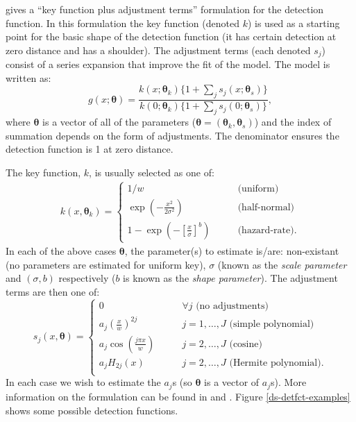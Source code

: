 \label{cor-7s5} gives a ``key function plus adjustment terms'' formulation for the detection function. In this formulation the key function (denoted $k$) is used as a starting point for the basic shape of the detection function (it has certain detection at zero distance and has a shoulder). The adjustment terms (each denoted $s_j$) consist of a series expansion that improve the fit of the model. The model is written as:
\begin{equation*}
g(x; \bm{\theta}) = \frac{k(x; \bm{\theta}_k) \{1+\sum_j s_j(x; \bm{\theta}_s)\}}{k(0; \bm{\theta}_k) \{1+ \sum_j s_j(0; \bm{\theta}_s)\}},
\end{equation*}
where $\bm{\theta}$ is a vector of all of the parameters ($\bm{\theta}=(\bm{\theta}_k,\bm{\theta}_s)$) and the index of summation depends on the form of adjustments. The denominator ensures the detection function is 1 at zero distance. 

The key function, $k$, is usually selected as one of:
\begin{align*}
k(x,\bm{\theta}_k) = \begin{cases} 1/w &\qquad \text{(uniform)}\\
\exp \left( -\frac{x^2}{2\sigma^2}\right) &\qquad \text{(half-normal)}\\
1- \exp \left( -\left[ \frac{x}{\sigma}\right]^b\right) &\qquad \text{(hazard-rate)}.
\label{ds-detfct}
\end{cases}
\end{align*}
In each of the above cases $\bm{\theta}$, the parameter(s) to estimate is/are: non-existant (no parameters are estimated for uniform key), $\sigma$ (known as the \textit{scale parameter} and $(\sigma,b)$ respectively ($b$ is known as the \textit{shape parameter}). The adjustment terms are then one of:
\begin{equation*}
s_j(x,\bm{\theta}) = \begin{cases} 0 & \qquad \forall j \text{ (no adjustments)}\\
a_j \left( \frac{x}{w}\right)^{2j} &\qquad j=1,\dots,J \text{ (simple polynomial)}\\
a_j \cos\left( \frac{j \pi x}{w}\right) & \qquad j=2,\dots,J \text{ (cosine)}\\
a_j H_{2j}(x)& \qquad j=2,\dots,J \text{ (Hermite polynomial)}.\\
\end{cases}
\end{equation*}
In each case we wish to estimate the $a_j$s (so $\bm{\theta}$ is a vector of $a_j$s). More information on the formulation can be found in  and . Figure \ref{ds-detfct-examples} shows some possible detection functions. 

